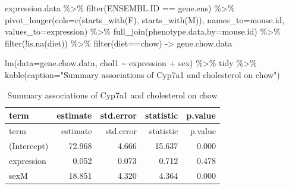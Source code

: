 \documentclass[
]{article}
\newenvironment{Shaded}{\begin{snugshade}}{\end{snugshade}}
\newcommand{\AttributeTok}[1]{\textcolor[rgb]{0.77,0.63,0.00}{#1}}
\newcommand{\FunctionTok}[1]{\textcolor[rgb]{0.00,0.00,0.00}{#1}}
\newcommand{\NormalTok}[1]{#1}
\newcommand{\OtherTok}[1]{\textcolor[rgb]{0.56,0.35,0.01}{#1}}
\newcommand{\SpecialCharTok}[1]{\textcolor[rgb]{0.00,0.00,0.00}{#1}}
\newcommand{\StringTok}[1]{\textcolor[rgb]{0.31,0.60,0.02}{#1}}
\begin{document}
\begin{Shaded}
\begin{Highlighting}[]
\NormalTok{expression.data }\SpecialCharTok{\%\textgreater{}\%}
  \FunctionTok{filter}\NormalTok{(ENSEMBL.ID }\SpecialCharTok{==}\NormalTok{ gene.ens) }\SpecialCharTok{\%\textgreater{}\%}
  \FunctionTok{pivot\_longer}\NormalTok{(}\AttributeTok{cols=}\FunctionTok{c}\NormalTok{(}\FunctionTok{starts\_with}\NormalTok{(}\StringTok{\textquotesingle{}F\textquotesingle{}}\NormalTok{),}
                      \FunctionTok{starts\_with}\NormalTok{(}\StringTok{\textquotesingle{}M\textquotesingle{}}\NormalTok{)),}
               \AttributeTok{names\_to=}\StringTok{\textquotesingle{}mouse.id\textquotesingle{}}\NormalTok{,}
               \AttributeTok{values\_to=}\StringTok{\textquotesingle{}expression\textquotesingle{}}\NormalTok{) }\SpecialCharTok{\%\textgreater{}\%}
  \FunctionTok{full\_join}\NormalTok{(phenotype.data,}\AttributeTok{by=}\StringTok{\textquotesingle{}mouse.id\textquotesingle{}}\NormalTok{) }\SpecialCharTok{\%\textgreater{}\%}
  \FunctionTok{filter}\NormalTok{(}\SpecialCharTok{!}\FunctionTok{is.na}\NormalTok{(diet)) }\SpecialCharTok{\%\textgreater{}\%}
  \FunctionTok{filter}\NormalTok{(diet}\SpecialCharTok{==}\StringTok{\textquotesingle{}chow\textquotesingle{}}\NormalTok{) }\OtherTok{{-}\textgreater{}}\NormalTok{ gene.chow.data}

\FunctionTok{lm}\NormalTok{(}\AttributeTok{data=}\NormalTok{gene.chow.data, chol1 }\SpecialCharTok{\textasciitilde{}}\NormalTok{ expression }\SpecialCharTok{+}\NormalTok{ sex) }\SpecialCharTok{\%\textgreater{}\%}
\NormalTok{  tidy }\SpecialCharTok{\%\textgreater{}\%}
  \FunctionTok{kable}\NormalTok{(}\AttributeTok{caption=}\StringTok{"Summary associations of Cyp7a1 and cholesterol on chow"}\NormalTok{)}
\end{Highlighting}
\end{Shaded}

\begin{longtable}[]{@{}lrrrr@{}}
\caption{Summary associations of Cyp7a1 and cholesterol on
chow}\tabularnewline
\toprule()
term & estimate & std.error & statistic & p.value \\
\midrule()
\endfirsthead
\toprule()
term & estimate & std.error & statistic & p.value \\
\midrule()
\endhead
(Intercept) & 72.968 & 4.666 & 15.637 & 0.000 \\
expression & 0.052 & 0.073 & 0.712 & 0.478 \\
sexM & 18.851 & 4.320 & 4.364 & 0.000 \\
\bottomrule()
\end{longtable}
\end{document}
